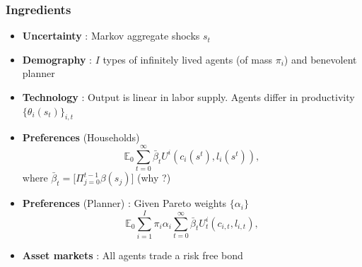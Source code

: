 \documentclass{beamer}
\begin{document}
% 
% 
% 
% 


\begin{frame}
 \frametitle{Ingredients}
 \begin{itemize}
 \item \textbf{Uncertainty }: Markov aggregate shocks $s_t$
  \item \textbf{Demography} : $I$ types of infinitely lived agents (of mass $\pi_i$)  and benevolent planner 
  \item \textbf{Technology }: Output is linear in labor supply. Agents differ in productivity $\{\theta_i(s_t)\}_{i,t}$
  \item \textbf{Preferences }(Households) 
  \begin{equation*}
\mathbb{E}_{0}\sum_{t=0}^{\infty } \bar{\beta}_t  U^{i}\left(
c_{i}(s^t),l_{i}(s^t)\right),  \label{utility lifetime}
\end{equation*}%
where $\bar{\beta}_t=\bigl[\Pi_{j=0}^{t-1}\beta(s_j)\bigr]$ (why ?)
\item \textbf{Preferences} (Planner) : Given Pareto weights $\{\alpha_i\}$
\begin{equation*}
\mathbb{E}_{0}\sum_{i=1}^{I}\pi _{i}\alpha _{i}\sum_{t=0}^{\infty }\bar{\beta}_t U_{t}^{i}\left( c_{i,t},l_{i,t}\right),  \label{govmt objective}
\end{equation*}
  \item \textbf{Asset markets} : All agents trade a risk free bond
  \end{itemize}

\end{frame}
\end{document}

